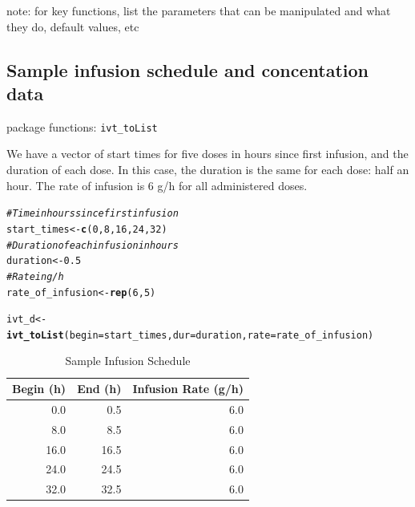 \documentclass{article}\usepackage[]{graphicx}\usepackage[]{color}
\makeatletter
\newcommand{\hlnum}[1]{\textcolor[rgb]{0.686,0.059,0.569}{#1}}%
\newcommand{\hlcom}[1]{\textcolor[rgb]{0.678,0.584,0.686}{\textit{#1}}}%
\newcommand{\hlstd}[1]{\textcolor[rgb]{0.345,0.345,0.345}{#1}}%
\newcommand{\hlkwb}[1]{\textcolor[rgb]{0.69,0.353,0.396}{#1}}%
\newcommand{\hlkwc}[1]{\textcolor[rgb]{0.333,0.667,0.333}{#1}}%
\newcommand{\hlkwd}[1]{\textcolor[rgb]{0.737,0.353,0.396}{\textbf{#1}}}%
\newenvironment{kframe}{%
 \def\at@end@of@kframe{}%
 \ifinner\ifhmode%
  \def\at@end@of@kframe{\end{minipage}}%
  \begin{minipage}{\columnwidth}%
 \fi\fi%
 \def\FrameCommand##1{\hskip\@totalleftmargin \hskip-\fboxsep
 \colorbox{shadecolor}{##1}\hskip-\fboxsep
     \hskip-\linewidth \hskip-\@totalleftmargin \hskip\columnwidth}%
 \MakeFramed {\advance\hsize-\width
   \@totalleftmargin\z@ \linewidth\hsize
   \@setminipage}}%
 {\par\unskip\endMakeFramed%
 \at@end@of@kframe}
\newenvironment{knitrout}{}{} %
\makeatother
\begin{document}
{\large note: for key functions, list the parameters that can be manipulated and what they do, default values, etc}

\subsection{Sample infusion schedule and concentation data}
package functions: \texttt{ivt\_toList}

We have a vector of start times for five doses in hours since first infusion, and the duration of each dose. In this case, the duration is the same for each dose: half an hour. The rate of infusion is 6 g/h for all administered doses.
\begin{knitrout}
\color{fgcolor}\begin{kframe}
\begin{alltt}
\hlcom{# Time in hours since first infusion}
\hlstd{start_times} \hlkwb{<-} \hlkwd{c}\hlstd{(}\hlnum{0}\hlstd{,} \hlnum{8}\hlstd{,} \hlnum{16}\hlstd{,} \hlnum{24}\hlstd{,} \hlnum{32}\hlstd{)}
\hlcom{# Duration of each infusion in hours}
\hlstd{duration} \hlkwb{<-} \hlnum{0.5}
\hlcom{# Rate in g/h}
\hlstd{rate_of_infusion} \hlkwb{<-} \hlkwd{rep}\hlstd{(}\hlnum{6}\hlstd{,} \hlnum{5}\hlstd{)}

\hlstd{ivt_d} \hlkwb{<-} \hlkwd{ivt_toList}\hlstd{(}\hlkwc{begin} \hlstd{= start_times,} \hlkwc{dur} \hlstd{= duration,} \hlkwc{rate} \hlstd{= rate_of_infusion)}
\end{alltt}
\end{kframe}
\end{knitrout}

\begin{table}[ht]
\centering
\caption{Sample Infusion Schedule} 
\begin{tabular}{rrr}
  \hline
Begin (h) & End (h) & Infusion Rate (g/h) \\ 
  \hline
0.0 & 0.5 & 6.0 \\ 
  8.0 & 8.5 & 6.0 \\ 
  16.0 & 16.5 & 6.0 \\ 
  24.0 & 24.5 & 6.0 \\ 
  32.0 & 32.5 & 6.0 \\ 
   \hline
\end{tabular}
\end{table}
\end{document}
